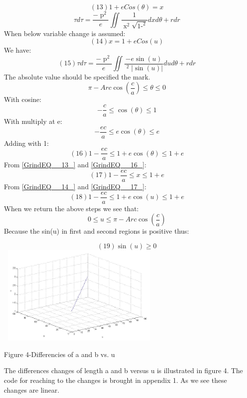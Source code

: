 \documentclass{article}
\begin{document}
\noindent 
\[                               (13)                      1+eCos(\theta )=x\] 
\[\tau d\tau =\frac{-\mathop{p}\nolimits^{2} }{e} \iint \frac{1}{\mathop{x}\nolimits^{2} \sqrt{\mathop{1-(\frac{x-1}{e} )}\nolimits^{2} } } dxd\theta  +rdr\] 
When below variable change is assumed:
\[                                 (14)                      x=1+eCos(u)\] 
We have:
\[                                 (15)          \tau d\tau =\frac{-\mathop{p}\nolimits^{2} }{e} \iint \frac{-e\sin \left(u\right)}{\mathop{\left(1+e\cos \left(u\right)\right)}\nolimits^{2} \left|\sin \left(u\right)\right|} dud\theta  +rdr\] 
The absolute value should be specified the mark.
\[\pi -Arc\cos (\frac{c}{a} )\le \theta \le 0\] 
With cosine:
\[-\frac{c}{a} \le \cos \left(\theta \right)\le 1\] 
With multiply at e:
\[-\frac{ec}{a} \le e\cos \left(\theta \right)\le e\] 
Adding with 1:
\[                           (16)              1-\frac{ec}{a} \le 1+e\cos \left(\theta \right)\le 1+e\] 
From \eqref{GrindEQ__13_} and \eqref{GrindEQ__16_}:
\[                           (17)                        1-\frac{ec}{a} \le x\le 1+e\] 
From \eqref{GrindEQ__14_} and \eqref{GrindEQ__17_}:
\[                           (18)                1-\frac{ec}{a} \le 1+e\cos \left(u\right)\le 1+e\] 
When we return the above steps we see that:
\[0\le u\le \pi -Arc\cos (\frac{c}{a} )\] 
Because the sin(u) in first and second regions is positive thus:

\noindent 
\[                           (19)                              \sin \left(u\right)\ge 0\] 
\includegraphics*[width=3.20in, height=1.93in, keepaspectratio=false]{image4.eps}

\noindent Figure 4-Differencies of a and b vs. u

\noindent The differences changes of length a and b versus u is illustrated in figure 4. The code for reaching to the changes is brought in appendix 1. As we see these changes are linear.
\end{document}
